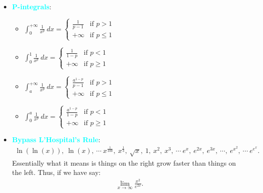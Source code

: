 \documentclass{report}
\begin{document}
\begin{itemize}
            \pagebreak \bigbreak \noindent 
        \item \textbf{\textcolor{cyan}{P-integrals}}:
            \begin{itemize}
                \item $\int_{0}^{+\infty} \frac{1}{x^{p}}\ dx =  
                    \begin{cases}
                        \frac{1}{p-1} & \text{if } p>1 \\
                        +\infty & \text{if } p \leq 1
                    \end{cases}$
                \item $\int_{0}^{1} \frac{1}{x^p}\ dx =    
                    \begin{cases}
                        \frac{1}{1-p} & \text{if } p<1 \\
                        +\infty & \text{if } p \geq 1
                    \end{cases}$
                \item $\int_{a}^{+\infty} \frac{1}{x^{p}}\ dx =  
                    \begin{cases}
                        \frac{a^{1-p}}{p-1} & \text{if } p>1 \\
                        +\infty & \text{if } p \leq 1
                    \end{cases}$
                \item $\int_{0}^{a} \frac{1}{x^p}\ dx =    
                    \begin{cases}
                        \frac{a^{1-p}}{1-p} & \text{if } p<1 \\
                        +\infty & \text{if } p \geq 1
                    \end{cases}$
            \end{itemize}
        \item \textbf{\textcolor{cyan}{Bypass L'Hospital's Rule}}:
            \begin{align*}
                \ln{(\ln{(x)})},\ \ln{(x)},\ \cdots\ x^{\frac{1}{100}},\ x^{\frac{1}{3}},\ \sqrt{x},\ 1,\ x^{2},\ x^{3},\ \cdots\ e^{x},\ e^{2x},\ e^{3x},\ \cdots,\ e^{x^{2}},\ \cdots\ e^{e^{x}}
            .\end{align*}
            Essentially what it means is things on the right grow faster than things on the left. Thus, if we have say:
            \begin{align*}
                \lim\limits_{x \to \infty}{\frac{x^{2}}{e^{2x}}} 
            .\end{align*}

\end{itemize}
\end{document}
